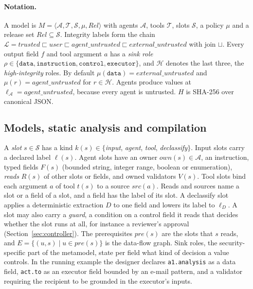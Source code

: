 \documentclass[pdflatex,sn-mathphys-num]{sn-jnl}
\theoremstyle{thmstyleone}%
\theoremstyle{thmstyletwo}%
\theoremstyle{thmstylethree}%
\begin{document}
\paragraph{Notation.} A model is $M = \langle \mathcal{A}, \mathcal{T}, \mathcal{S}, \mu, \mathit{Rel}\rangle$ with agents $\mathcal{A}$, tools $\mathcal{T}$, slots $\mathcal{S}$, a policy $\mu$ and a release set $\mathit{Rel} \subseteq \mathcal{S}$. Integrity labels form the chain $\mathcal{L} = \textit{trusted} \sqsubset \textit{user} \sqsubset \textit{agent\_untrusted} \sqsubset \textit{external\_untrusted}$ with join $\sqcup$. Every output field $f$ and tool argument $a$ has a \emph{sink role} $\rho \in \{\texttt{data}, \texttt{instruction}, \texttt{control}, \texttt{executor}\}$, and $\mathcal{H}$ denotes the last three, the \emph{high-integrity} roles. By default $\mu(\texttt{data}) = \textit{external\_untrusted}$ and $\mu(r) = \textit{agent\_untrusted}$ for $r \in \mathcal{H}$. Agents produce values at $\ell_{\mathcal{A}} = \textit{agent\_untrusted}$, because every agent is untrusted. $H$ is SHA-256 over canonical JSON.

\subsection{Models, static analysis and compilation}\label{sec:model}

A \emph{slot} $s \in \mathcal{S}$ has a kind $k(s) \in \{$\emph{input}, \emph{agent}, \emph{tool}, \emph{declassify}$\}$. Input slots carry a declared label $\ell(s)$. Agent slots have an owner $\mathit{own}(s) \in \mathcal{A}$, an instruction, typed fields $F(s)$ (bounded string, integer range, boolean or enumeration), \emph{reads} $R(s)$ of other slots or fields, and owned validators $V(s)$. Tool slots bind each argument $a$ of tool $t(s)$ to a source $\mathit{src}(a)$. Reads and sources name a slot or a field of a slot, and a field has the label of its slot. A declassify slot applies a deterministic extraction $D$ to one field and lowers its label to $\ell_D$. A slot may also carry a \emph{guard}, a condition on a control field it reads that decides whether the slot runs at all, for instance a reviewer's approval (Section~\ref{sec:controller}). The prerequisites $\mathit{pre}(s)$ are the slots that $s$ reads, and $E = \{(u, s) \mid u \in \mathit{pre}(s)\}$ is the data-flow graph. Sink roles, the security-specific part of the metamodel, state per field what kind of decision a value controls. In the running example the designer declares \texttt{a1.analysis} as a data field, \texttt{act.to} as an executor field bounded by an e-mail pattern, and a validator requiring the recipient to be grounded in the executor's inputs.
\end{document}
